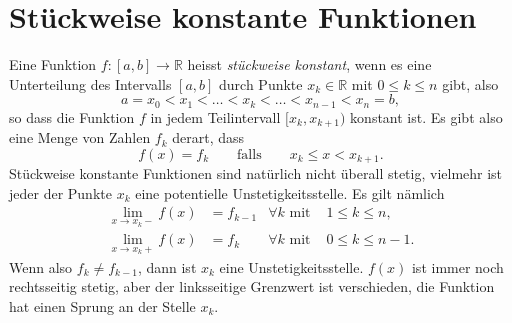 %
%
%
\section{Stückweise konstante Funktionen%
\label{section:stueckweise}}
Eine Funktion $f\colon[a,b]\to\mathbb R$ heisst {\em stückweise konstant},
wenn es eine Unterteilung des Intervalls $[a,b]$ durch Punkte
%
$x_k\in\mathbb R$ mit $0\le k\le n$ gibt, also
\[
a=x_0 < x_1 < \dots < x_k < \dots < x_{n-1} < x_n = b,
\]
so dass die Funktion $f$ in jedem Teilintervall $[x_k,x_{k+1})$
konstant ist.
Es gibt also eine Menge von Zahlen $f_k$ derart, dass
\begin{equation}
f(x)
=
f_k
\qquad\text{falls}\qquad
x_k \le x < x_{k+1}.
\label{buch:stückweisef}
\end{equation}
Stückweise konstante Funktionen sind natürlich nicht überall stetig,
vielmehr ist jeder der Punkte $x_k$ eine potentielle Unstetigkeitsstelle.
Es gilt nämlich
\begin{equation*}
\begin{aligned}
\lim_{x\to x_k-} f(x)
&=
f_{k-1}&\forall k\text{ mit }&1\le k \le n,
\\
\lim_{x\to x_k+} f(x)
&=
f_k&\forall k\text{ mit }&0\le k \le n-1.
\end{aligned}
\end{equation*}
Wenn also $f_k\ne f_{k-1}$, dann ist $x_k$ eine Unstetigkeitsstelle.
$f(x)$ ist immer noch rechtsseitig stetig, aber der linksseitige
Grenzwert ist verschieden, die Funktion hat einen Sprung an der
Stelle $x_k$.

